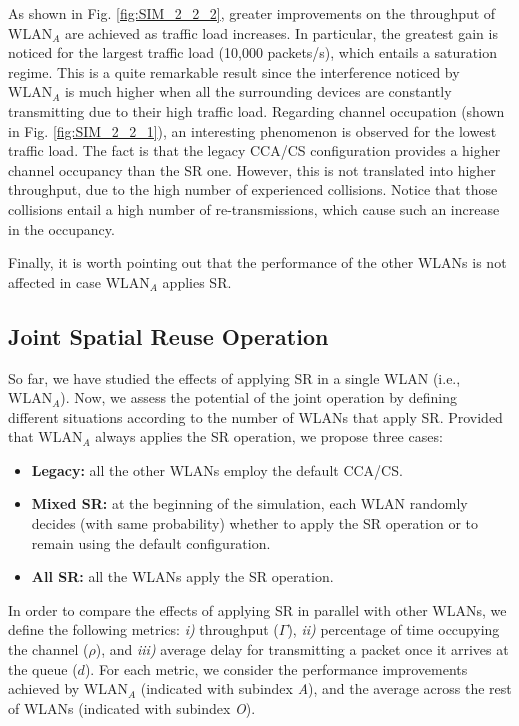 \documentclass[preprint,12pt]{elsarticle}
\begin{document}
	As shown in Fig. \ref{fig:SIM_2_2_2}, greater improvements on the throughput of $\text{WLAN}_A$ are achieved as traffic load increases. In particular, the greatest gain is noticed for the largest traffic load (10,000 packets/s), which entails a saturation regime. This is a quite remarkable result since the interference noticed by $\text{WLAN}_A$ is much higher when all the surrounding devices are constantly transmitting due to their high traffic load. Regarding channel occupation (shown in Fig. \ref{fig:SIM_2_2_1}), an interesting phenomenon is observed for the lowest traffic load. The fact is that the legacy CCA/CS configuration provides a higher channel occupancy than the SR one. However, this is not translated into higher throughput, due to the high number of experienced collisions. Notice that those collisions entail a high number of re-transmissions, which cause such an increase in the occupancy.
	
	Finally, it is worth pointing out that the performance of the other WLANs is not affected in case $\text{WLAN}_A$ applies SR.
	
	\subsection{Joint Spatial Reuse Operation}
	\label{section:random_scenarios_collaborative}
	So far, we have studied the effects of applying SR in a single WLAN (i.e., $\text{WLAN}_A$). Now, we assess the potential of the joint operation by defining different situations according to the number of WLANs that apply SR. Provided that $\text{WLAN}_A$ always applies the SR operation, we propose three cases: 
	\begin{itemize}
		\item \textbf{Legacy:} all the other WLANs employ the default CCA/CS.
		\item \textbf{Mixed SR:} at the beginning of the simulation, each WLAN randomly decides (with same probability) whether to apply the SR operation or to remain using the default configuration.
		\item \textbf{All SR:} all the WLANs apply the SR operation. 
	\end{itemize}
	
	In order to compare the effects of applying SR in parallel with other WLANs, we define the following metrics: \emph{i)} throughput ($\Gamma$), \emph{ii)} percentage of time occupying the channel ($\rho$), and \emph{iii)} average delay for transmitting a packet once it arrives at the queue ($d$). For each metric, we consider the performance improvements achieved by $\text{WLAN}_A$ (indicated with subindex \emph{A}), and the average across the rest of WLANs (indicated with subindex \emph{O}).
	
\end{document}
